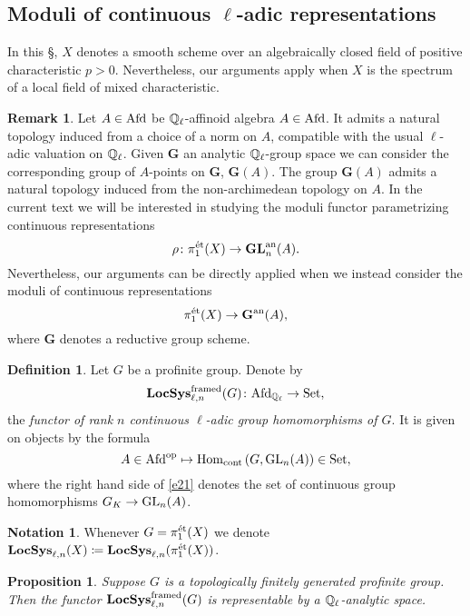 \documentclass[10pt,a4paper]{amsart}
\numberwithin{equation}{subsection}
\theoremstyle{plain}
\newtheorem{prop}[theorem]{Proposition}
\theoremstyle{definition}
\newtheorem{defi}[theorem]{Definition}
\newtheorem{notation}[theorem]{Notation}
\newtheorem{rema}[theorem]{Remark}
\theoremstyle{remark}
\numberwithin{equation}{section}
\begin{document}
\subsection{Moduli of continuous $\ell$-adic representations} \label{section 2.3}
In this \S, $X$ denotes a smooth scheme over an algebraically closed field of positive characteristic $p > 0$. Nevertheless, our arguments apply when $X$ is
the spectrum of a local field of mixed characteristic.


\begin{rema}
Let $A \in \mathrm{Afd}$ be $\mathbb{Q}_{\ell}$-affinoid algebra $A \in \mathrm{Afd}$. It admits a natural topology induced from a choice of a norm on $A$, compatible with the usual $\ell$-adic valuation on $\mathbb{Q}_\ell$. 
Given $\mathbf G$
an analytic $\mathbb{Q}_\ell$-group space we can consider the corresponding group of $A$-points on $\mathbf G$, $\mathbf G(A)$. The group $\mathbf G (A)$ admits a natural topology induced from the non-archimedean topology on $A$.
In the current text we will be interested in studying the moduli functor parametrizing continuous representations
	\[
		\rho \colon \pi_1^{\text{\'et}}(X) \to \mathbf{GL}_n^{\mathrm{an}}(A).
	\]
Nevertheless, our arguments can be directly applied when we instead consider the moduli of continuous representations 
    \[
        \pi_1^{\text{\'et}}(X) \to \mathbf G^{\mathrm{an}} (A),
    \]
where $\mathbf G$ denotes a reductive group scheme.
\end{rema}

\begin{defi} Let $G$ be a profinite group.
Denote by
	\[
		\mathbf{LocSys}_{\ell, n}^{\mathrm{framed}}(G) \colon \mathrm{Afd}_{\mathbb{Q}_\ell} \to  \mathrm{Set},
	\]
the \emph{functor of rank $n$ continuous $\ell$-adic group homomorphisms of $G$}. It is given on objects by the formula
	\begin{equation} \label{e21}
		A \in \mathrm{Afd}^{\mathrm{op}} \mapsto \mathrm{Hom}_{\mathrm{cont}} \left( G, \mathrm{GL}_n( A) \right) \in \mathrm{Set},
	\end{equation}
where the right hand side of \eqref{e21} denotes the set of continuous group homomorphisms $G_K \to \mathrm{GL}_n(A)$.
\end{defi}

\begin{notation}
Whenever $G = \pi_1^{\text{\'et}}(X)$ we denote $\mathbf{LocSys}_{\ell, n}(X) \coloneqq \mathbf{LocSys}_{\ell, n}(\pi_1^{\text{\'et}}(X))$.
\end{notation}

\begin{prop}{\cite[Corollary 2.2.16]{me1}} \label{me1}
Suppose $G$ is a topologically finitely generated profinite group. Then the functor $\mathbf{LocSys}_{\ell, n}^{\mathrm{framed}}(G)$
is representable by a $\mathbb{Q}_{\ell}$-analytic space. 
\end{prop}
\end{document}
